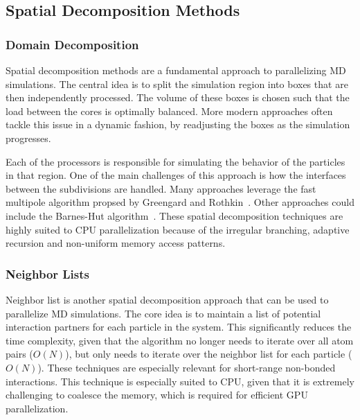 \documentclass[conference]{IEEEtran}
\begin{document}
    \subsection{Spatial Decomposition Methods}

        \subsubsection{Domain Decomposition}
        Spatial decomposition methods are a fundamental approach to parallelizing MD simulations. The central idea is to 
        split the simulation region into boxes that are then independently processed. The volume of
        these boxes is chosen such that the load between the cores is optimally balanced. More modern approaches often
        tackle this issue in a dynamic fashion, by readjusting the boxes as the simulation progresses.


        Each of the processors is responsible for simulating the behavior of the particles in that region. One of the main
        challenges of this approach is how the interfaces between the subdivisions are handled. Many approaches
        leverage the fast multipole algorithm propsed by Greengard and Rothkin~\cite{greengard1987fast}. Other approaches
        could include the Barnes-Hut algorithm~\cite{barnes1986hierarchical}. These spatial decomposition 
        techniques are highly suited to CPU parallelization because of the irregular branching, adaptive recursion and 
        non-uniform memory
        access patterns. 

        \subsubsection{Neighbor Lists}
        Neighbor list is another spatial decomposition approach that can be used to parallelize MD simulations. The
        core idea is to maintain a list of potential interaction partners for each particle in the system. This
        significantly reduces the time complexity, given that the algorithm no longer needs to iterate over all
        atom pairs ($O(N)$), but only needs to iterate over the neighbor list for each particle ($O(N)$). These
        techniques are especially relevant for short-range non-bonded interactions. This technique is especially
        suited to CPU, given that it is extremely challenging to coalesce the memory, which is required for efficient
        GPU parallelization.~\cite{allen2017computer,verlet1967computer}
\end{document}
